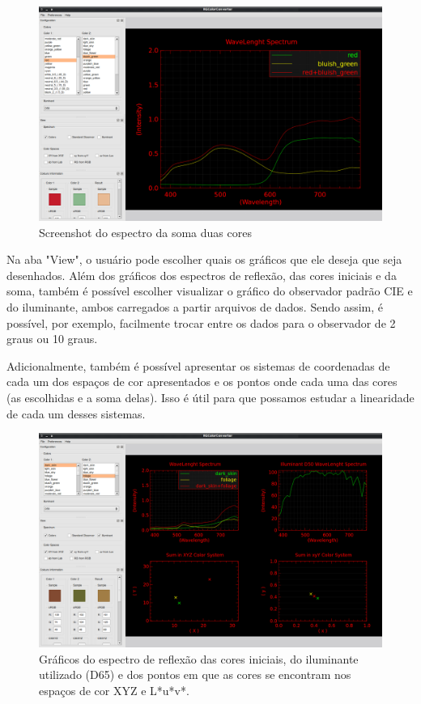 \begin{figure}[!htb]
     \centering
     \includegraphics[scale=0.6]{img/screenshot_RGColorConverter.png}
     \caption{Screenshot do espectro da soma duas cores}
     \label{fig:screenshot_01}
\end{figure}

\par
Na aba "View", o usuário pode escolher quais os gráficos que ele deseja
que seja desenhados. Além dos gráficos dos espectros de reflexão, das cores
iniciais e da soma, também é possível escolher visualizar o gráfico do
observador padrão CIE e do iluminante, ambos carregados a partir arquivos de
dados. Sendo assim, é possível, por exemplo, facilmente trocar entre os dados
para o observador de 2 graus ou 10 graus.

\par
Adicionalmente, também é possível apresentar os sistemas de coordenadas de cada
um dos espaços de cor apresentados e os pontos onde cada uma das cores (as
escolhidas e a soma delas). Isso é útil para que possamos estudar a linearidade
de cada um desses sistemas.

\begin{figure}[!htb]
     \centering
\includegraphics[scale=0.6]
{img/screenshot_RGColorConverter_XYZ_Illuminant_xyY.png}
     \caption{Gráficos do espectro de reflexão das cores iniciais, do
iluminante utilizado (D65) e dos pontos em que as cores se encontram nos
espaços de cor XYZ e L*u*v*.}
     \label{fig:screenshot_XYZ_illuminant_Luv}
\end{figure}


